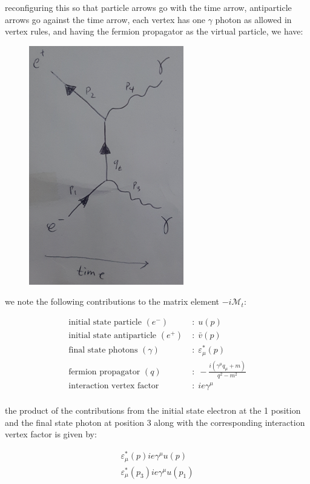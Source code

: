 \documentclass[11pt]{article}
\theoremstyle{definition}
\begin{document}
reconfiguring this so that particle arrows go with the time arrow, antiparticle arrows go against the time arrow, each vertex has one $\gamma$ photon as allowed in vertex rules, and having the fermion propagator as the virtual particle, we have:

\begin{figure}[H]
    \centering
    \includegraphics[scale = 0.4]{final t-channel.png}
\end{figure}

we note the following contributions to the matrix element $-i\mathcal{M}_t$:

\begin{align*}
    \text{initial state particle }(e^{-}) \; &: \; u(p)\\
    \text{initial state antiparticle }(e^{+}) \; &: \; \bar{v}(p)\\
    \text{final state photons }(\gamma) \; &: \; \varepsilon^{*}_{\mu}(p)\\
    \text{fermion propagator }(q) \; &: \; -\frac{i(\gamma^{\mu} q_{\mu} + m)}{q^2-m^2}\\
    \text{interaction vertex factor } \; &: \; ie\gamma^{\mu}\\
\end{align*}

the product of the contributions from the initial state electron at the 1 position and the final state photon at position 3 along with the corresponding interaction vertex factor is given by:

\begin{align}
    \varepsilon^{*}_{\mu}(p)ie\gamma^{\mu}u(p)\\
    \varepsilon^{*}_{\mu}(p_3)ie\gamma^{\mu}u(p_1)\\
\end{align}
\end{document}
